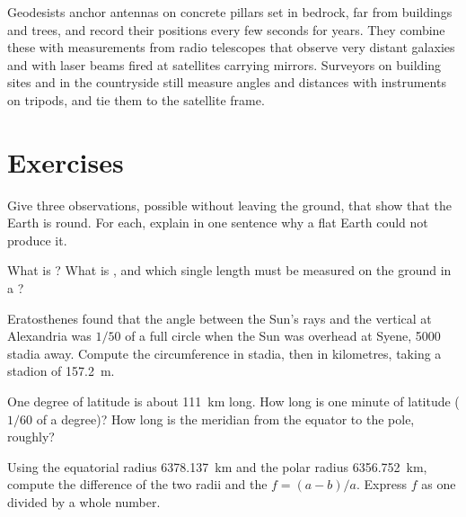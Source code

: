 \begin{inthefield}
Geodesists anchor antennas on concrete pillars set in bedrock, far from
buildings and trees, and record their positions every few seconds for years.
They combine these with measurements from radio telescopes that observe very
distant galaxies and with laser beams fired at satellites carrying mirrors.
Surveyors on building sites and in the countryside still measure angles and
distances with instruments on tripods, and tie them to the satellite frame.
\end{inthefield}

\section{Exercises}

\begin{exercise}[$\star$]\label{exo:g10:measuring-the-earth:1}
Give three observations, possible without leaving the ground, that show
that the Earth is round. For each, explain in one sentence why a flat Earth
could not produce it.
\end{exercise}

\begin{exercise}[$\star$]\label{exo:g10:measuring-the-earth:2}
What is ? What is , and which single length must be
measured on the ground in a ?
\end{exercise}

\begin{exercise}[$\star$]\label{exo:g10:measuring-the-earth:3}
Eratosthenes found that the angle between the Sun's rays and the vertical at
Alexandria was $1/50$ of a full circle when the Sun was overhead at Syene,
5000 stadia away. Compute the circumference in stadia, then in kilometres,
taking a stadion of \qty{157.2}{m}.
\end{exercise}

\begin{exercise}[$\star$]\label{exo:g10:measuring-the-earth:4}
One degree of latitude is about \qty{111}{km} long. How long is one minute
of latitude ($1/60$ of a degree)? How long is the meridian from the equator
to the pole, roughly?
\end{exercise}

\begin{exercise}[$\star$]\label{exo:g10:measuring-the-earth:5}
Using the equatorial radius \qty{6378.137}{km} and the polar radius
\qty{6356.752}{km}, compute the difference of the two radii and the
 $f = (a-b)/a$. Express $f$ as one divided by a whole number.
\end{exercise}

